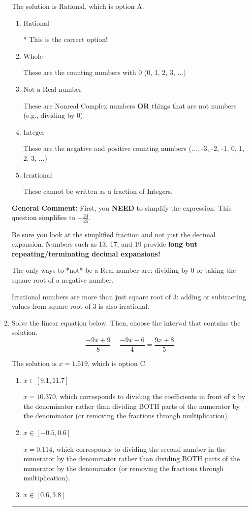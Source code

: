 \documentclass{extbook}[14pt]
\newcommand{\litem}[1]{\item #1

\rule{\textwidth}{0.4pt}}
\begin{document}
\begin{enumerate}
{The solution is \( \text{Rational} \), which is option A.\begin{enumerate}[label=\Alph*.]
\item \( \text{Rational} \)

* This is the correct option!
\item \( \text{Whole} \)

These are the counting numbers with 0 (0, 1, 2, 3, ...)
\item \( \text{Not a Real number} \)

These are Nonreal Complex numbers \textbf{OR} things that are not numbers (e.g., dividing by 0).
\item \( \text{Integer} \)

These are the negative and positive counting numbers (..., -3, -2, -1, 0, 1, 2, 3, ...)
\item \( \text{Irrational} \)

These cannot be written as a fraction of Integers.
\end{enumerate}

\textbf{General Comment:} First, you \textbf{NEED} to simplify the expression. This question simplifies to $-\frac{24}{25}$. 
 
 Be sure you look at the simplified fraction and not just the decimal expansion. Numbers such as 13, 17, and 19 provide \textbf{long but repeating/terminating decimal expansions!} 
 
 The only ways to *not* be a Real number are: dividing by 0 or taking the square root of a negative number. 
 
 Irrational numbers are more than just square root of 3: adding or subtracting values from square root of 3 is also irrational.
}
\litem{
Solve the linear equation below. Then, choose the interval that contains the solution.
\[ \frac{-9x + 9}{8} - \frac{-9x -6}{4} = \frac{9x + 8}{5} \]

The solution is \( x = 1.519 \), which is option C.\begin{enumerate}[label=\Alph*.]
\item \( x \in [9.1, 11.7] \)

 $x = 10.370$, which corresponds to dividing the coefficients in front of x by the denominator rather than dividing BOTH parts of the numerator by the denominator (or removing the fractions through multiplication).
\item \( x \in [-0.5, 0.6] \)

 $x = 0.114$, which corresponds to dividing the second number in the numerator by the denominator rather than dividing BOTH parts of the numerator by the denominator (or removing the fractions through multiplication).
\item \( x \in [0.6, 3.8] \)


\end{enumerate}}
\end{enumerate}
\end{document}
